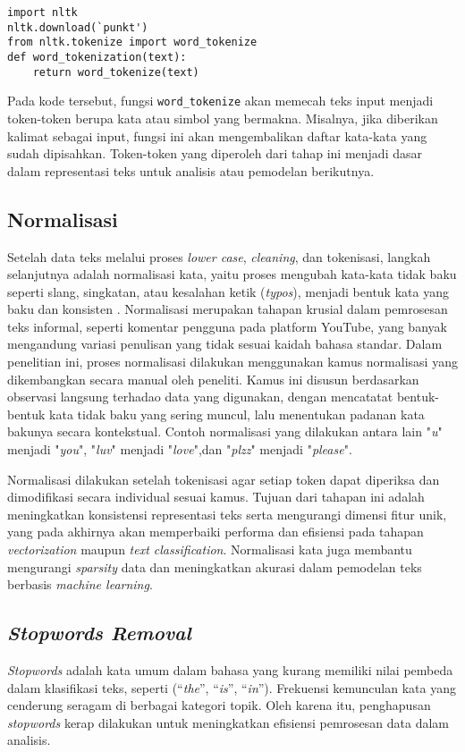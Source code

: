 \documentclass[a4paper,12pt]{report}
\numberwithin{equation}{chapter}
\begin{document}
\begin{verbatim}
import nltk 
nltk.download(`punkt')
from nltk.tokenize import word_tokenize 
def word_tokenization(text):
    return word_tokenize(text) 
\end{verbatim}


Pada kode tersebut, fungsi \texttt{word\_tokenize} akan memecah teks input menjadi token-token berupa kata atau simbol yang bermakna. Misalnya, jika diberikan kalimat sebagai input, fungsi ini akan mengembalikan daftar kata-kata yang sudah dipisahkan. Token-token yang diperoleh dari tahap ini menjadi dasar dalam representasi teks untuk analisis atau pemodelan berikutnya.

\subsection{Normalisasi}
Setelah data teks melalui proses \textit{lower case}, \textit{cleaning}, dan tokenisasi, langkah selanjutnya adalah normalisasi kata, yaitu proses mengubah kata-kata tidak baku seperti slang, singkatan, atau kesalahan ketik (\textit{typos}), menjadi bentuk kata yang baku dan konsisten \citep{article}. Normalisasi merupakan tahapan krusial dalam pemrosesan teks informal, seperti komentar pengguna pada platform YouTube, yang banyak mengandung variasi penulisan yang tidak sesuai kaidah bahasa standar. Dalam penelitian ini, proses normalisasi dilakukan menggunakan kamus normalisasi yang dikembangkan secara manual oleh peneliti. Kamus ini disusun berdasarkan observasi langsung terhadao data yang digunakan, dengan mencatatat bentuk-bentuk kata tidak baku yang sering muncul, lalu menentukan padanan kata bakunya secara kontekstual. Contoh normalisasi yang dilakukan antara lain "\textit{u}" menjadi "\textit{you}", "\textit{luv}" menjadi "\textit{love}",dan "\textit{plzz}" menjadi "\textit{please}". 

Normalisasi dilakukan setelah tokenisasi agar setiap token dapat diperiksa dan dimodifikasi secara individual sesuai kamus. Tujuan dari tahapan ini adalah meningkatkan konsistensi representasi teks serta mengurangi dimensi fitur unik, yang pada akhirnya akan memperbaiki performa dan efisiensi pada tahapan \textit{vectorization} maupun \textit{text classification}. Normalisasi kata juga membantu mengurangi \textit{sparsity} data dan meningkatkan akurasi dalam pemodelan teks berbasis \textit{machine learning}.


\subsection{\textit{Stopwords Removal}}
\textit{Stopwords} adalah kata umum dalam bahasa yang kurang memiliki nilai pembeda dalam klasifikasi teks, seperti (``\textit{the}'', ``\textit{is}'', ``\textit{in}''). Frekuensi kemunculan kata yang cenderung seragam di berbagai kategori topik. Oleh karena itu, penghapusan \textit{stopwords} kerap dilakukan untuk meningkatkan efisiensi pemrosesan data dalam analisis.
\end{document}
